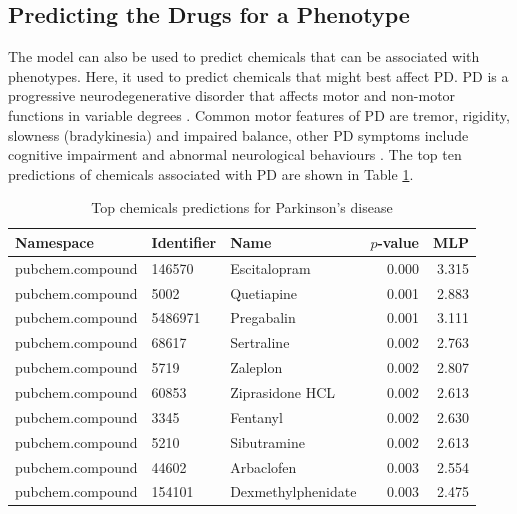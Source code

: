 \subsection{Predicting the Drugs for a Phenotype}
The model can also be used to predict chemicals that can be associated with phenotypes. Here, it used to predict chemicals that might best affect \ac{PD}. 
\ac{PD} is a progressive neurodegenerative disorder that affects motor and non-motor functions in variable degrees \cite{jankovic_parkinsons_2008}. Common motor features of \ac{PD} are tremor, rigidity, slowness (bradykinesia) and impaired balance, other PD symptoms include cognitive impairment and abnormal neurological behaviours \cite{jankovic_parkinsons_2008}. The top ten predictions of chemicals associated with \ac{PD} are shown in Table \ref{tab:phenotype_drug}.

\begin{table}[h]
    \centering
    \begin{tabular}{|l|l|l|r|r|} 
        \hline
        \textbf{Namespace} & \textbf{Identifier} & \textbf{Name} & \textbf{$p$-value} & \textbf{MLP} \\
        \hline
        pubchem.compound &  146570 &  Escitalopram &  0.000 &  3.315 \\
        \hline
        pubchem.compound & 5002 &  Quetiapine &  0.001 &  2.883 \\
        \hline
        pubchem.compound &  5486971 &  Pregabalin &  0.001 &  3.111 \\
        \hline
        pubchem.compound & 68617 &  Sertraline &  0.002 &  2.763 \\
        \hline
        pubchem.compound &  5719 &  Zaleplon &  0.002 &  2.807 \\
        \hline
        pubchem.compound & 60853 & Ziprasidone HCL &  0.002 &  2.613 \\
        \hline
        pubchem.compound & 3345 & Fentanyl &  0.002 &  2.630 \\
        \hline
        pubchem.compound & 5210 & Sibutramine &  0.002 &  2.613 \\
        \hline
        pubchem.compound & 44602 &  Arbaclofen &  0.003 &  2.554 \\
        \hline
        pubchem.compound & 154101 & Dexmethylphenidate &  0.003 &  2.475 \\
        \hline
    \end{tabular}
    \caption{Top chemicals predictions for Parkinson's disease}
    \label{tab:phenotype_drug}
\end{table}

